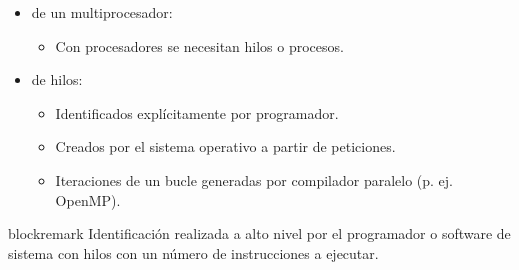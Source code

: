 \begin{frame}[t]
\begin{itemize}
  \item {} de un multiprocesador:
    \begin{itemize}
      \item Con  procesadores se necesitan  hilos o procesos.
    \end{itemize}

  \item {} de hilos:
    \begin{itemize}
      \item Identificados explícitamente por programador.
      \item Creados por el sistema operativo a partir de peticiones.
      \item Iteraciones de un bucle generadas por compilador paralelo (p. ej. OpenMP).
    \end{itemize}
\end{itemize}

\begin{beamercolorbox}[sep=1em,wd=\textwidth]{blockremark}
Identificación realizada a alto nivel por el programador o software de sistema
con hilos con un número  de instrucciones a ejecutar.
\end{beamercolorbox}

\end{frame}

